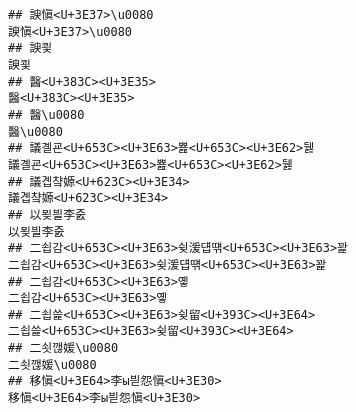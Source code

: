 \documentclass[]{article}
\begin{document}
\begin{verbatim}
## 諛愼<U+3E37>\u0080                                                                                                                                                                                               諛愼<U+3E37>\u0080
## 諛쾿                                                                                                                                                                                                                     諛쾿
## 醫<U+383C><U+3E35>                                                                                                                                                                                                     醫<U+383C><U+3E35>
## 醫\u0080                                                                                                                                                                                                             醫\u0080
## 議곌굔<U+653C><U+3E63>뾾<U+653C><U+3E62>뒗                                                                                                                                                                 議곌굔<U+653C><U+3E63>뾾<U+653C><U+3E62>뒗
## 議곕챸嫄<U+623C><U+3E34>                                                                                                                                                                                         議곕챸嫄<U+623C><U+3E34>
## 以묒븰李줈                                                                                                                                                                                                         以묒븰李줈
## 二쇱감<U+653C><U+3E63>슂湲덉떆<U+653C><U+3E63>꽕                                                                                                                                                     二쇱감<U+653C><U+3E63>슂湲덉떆<U+653C><U+3E63>꽕
## 二쇱감<U+653C><U+3E63>옣                                                                                                                                                                                         二쇱감<U+653C><U+3E63>옣
## 二쇱쓽<U+653C><U+3E63>슂留<U+393C><U+3E64>                                                                                                                                                                 二쇱쓽<U+653C><U+3E63>슂留<U+393C><U+3E64>
## 二쇳깮媛\u0080                                                                                                                                                                                                 二쇳깮媛\u0080
## 移愼<U+3E64>李ы븯怨愼<U+3E30>                                                                                                                                                                             移愼<U+3E64>李ы븯怨愼<U+3E30>

\end{verbatim}
\end{document}
